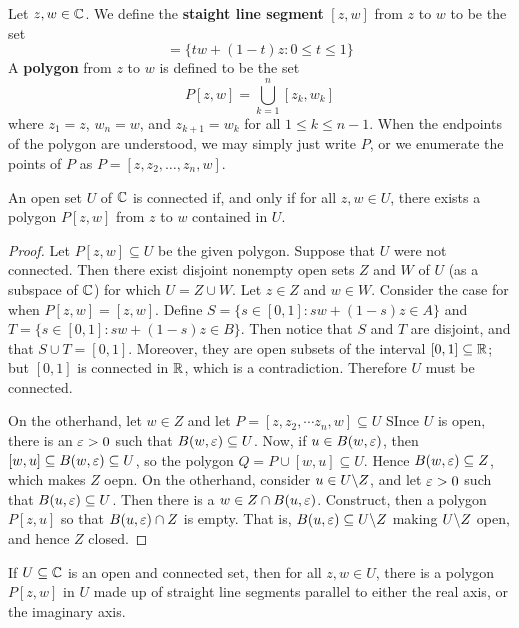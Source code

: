 \begin{definition}
    Let $z,w \in \mathbb{C}$. We define the  \textbf{staight line segment} $[z,w]$
    from $z$ to  $w$ to be the set
    \begin{equation*}
        [z,w]=\{tw+(1-t)z : 0 \leq t \leq 1\}
    \end{equation*}
    A \textbf{polygon} from $z$ to  $w$ is defined to be the set
    \begin{equation*}
        P[z,w]=\bigcup_{k=1}^n{[z_k,w_k]}
    \end{equation*}
    where $z_1=z$,  $w_n=w$, and  $z_{k+1}=w_k$ for all $1 \leq k \leq n-1$.
    When the endpoints of the polygon are understood, we may simply just write
    $P$, or we enumerate the points of $P$ as  $P=[z,z_2, \dots, z_n,w]$.
\end{definition}

\begin{theorem}\label{2.2.3}
    An open set $U$ of  $\mathbb{C}$ is connected if, and only if for all  $z,w \in U$,
    there exists a polygon $P[z,w]$ from $z$ to  $w$ contained in $U$.
\end{theorem}
\begin{proof}
    Let $P[z,w] \subseteq U$ be the given polygon. Suppose that $U$ were not
    connected. Then there exist disjoint nonempty open sets $Z$ and $W$ of $U$
    (as a subspace of $\mathbb{C}$) for which $U=Z \cup W$. Let  $z \in Z$ and $w \in
    W$. Consider the case for when $P[z,w]=[z,w]$. Define $S=\{s \in [0,1] :
    sw+(1-s)z \in A\}$ and $T=\{s \in [0,1] : sw+(1-s)z \in B\}$. Then notice
    that $S$ and $T$ are disjoint, and that $S \cup T=[0,1]$. Moreover, they are
    open subsets of the interval $[0,1] \subseteq \mathbb{R}$; but $[0,1]$ is connected
    in $\mathbb{R}$, which is a contradiction. Therefore  $U$ must be connected.

    On the otherhand, let  $w \in Z$ and let  $P=[z,z_2, \dotsm z_n,w] \subseteq
    U$ SInce $U$ is open, there is an $\varepsilon>0$ such that  $B(w,\varepsilon) \subseteq U$.
    Now, if $u \in B(w,\varepsilon)$, then $[w,u] \subseteq B(w,\varepsilon) \subseteq U$, so the
    polygon $Q=P \cup [w, u] \subseteq U$. Hence $B(w,\varepsilon) \subseteq Z$, which
    makes $Z$ oepn. On the otherhand, consider  $u \in U \backslash Z$, and let
    $\varepsilon>0$ such that $B(u,\varepsilon) \subseteq U$. Then there is a $w \in Z \cap
    B(u,\varepsilon)$. Construct, then a polygon $P[z,u]$ so that $B(u,\varepsilon) \cap Z$ is
    empty. That is, $B(u,\varepsilon) \subseteq U \backslash Z$ making $U \backslash Z$ open, and
    hence $Z$ closed.
\end{proof}
\begin{corollary}
    If $U \subseteq \mathbb{C}$ is an open and connected set, then for all  $z,w \in U$,
    there is a polygon  $P[z,w]$ in $U$ made up of straight line segments
    parallel to either the real axis, or the imaginary axis.
\end{corollary}

